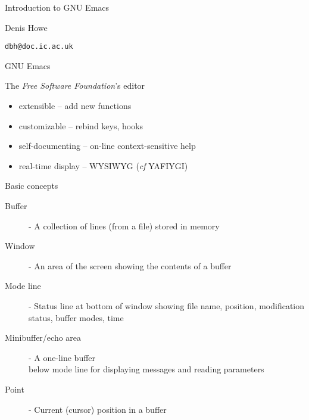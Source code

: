 

\pagestyle{plain}


\begin{slide}{}
\centering
Introduction to GNU Emacs
\vspace{3cm}

Denis Howe

{\tt dbh@doc.ic.ac.uk}
\end{slide}

\begin{slide}{}
GNU Emacs

The {\em Free Software Foundation}'s editor
\begin{itemize}
\item extensible -- add new functions
\item customizable -- rebind keys, hooks
\item self-documenting -- on-line context-sensitive help
\item real-time display -- WYSIWYG ({\it cf} YAFIYGI)
\end{itemize}
\end{slide}

\begin{slide}{}
\end{slide}

\begin{slide}{}
Basic concepts
\begin{description}
\item[Buffer]
- A collection of lines (from a file) stored in memory

\item[Window]
- An area of the screen showing the contents of a buffer

\item[Mode line]
- Status line at bottom of window showing file name, position,
modification status, buffer modes, time

\item[Minibuffer/echo area]
- A one-line buffer \\
below mode line for displaying messages and reading parameters

\item[Point]
- Current (cursor) position in a buffer
\end{description}
\end{slide}

